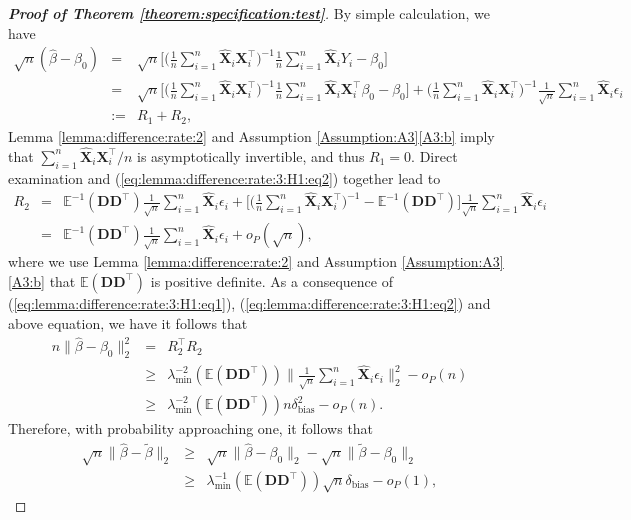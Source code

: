 \documentclass[11pt, preprint]{imsart}
\numberwithin{equation}{section}
\def \bfD{\mathbf{D}}
\def \bfX{\mathbf{X}}
\def \bfD{\mathbf{D}}
\def \ev{\mathbb{E}}
\theoremstyle{plain}
\theoremstyle{definition}
\begin{document}
\begin{proof}[\textbf{Proof of Theorem \ref{theorem:specification:test}}]
By simple calculation, we have
\begin{eqnarray*}
	\sqrt{n}(\widehat{\beta}-\beta_0)&=&\sqrt{n}\bigg[\bigg(\frac{1}{n}\sum_{i=1}^n\widehat{\bfX}_i{\bfX}_i^\top\bigg)^{-1}\frac{1}{n}\sum_{i=1}^n\widehat{\bfX}_iY_i-\beta_0\bigg]\nonumber\\
	&=&\sqrt{n}\bigg[\bigg(\frac{1}{n}\sum_{i=1}^n\widehat{\bfX}_i{\bfX}_i^\top\bigg)^{-1}\frac{1}{n}\sum_{i=1}^n\widehat{\bfX}_i\bfX_i^\top \beta_0-\beta_0\bigg]+\bigg(\frac{1}{n}\sum_{i=1}^n\widehat{\bfX}_i{\bfX}_i^\top\bigg)^{-1}\frac{1}{\sqrt{n}}\sum_{i=1}^n\widehat{\bfX}_i\epsilon_i\nonumber\\
	&:=&R_1+R_2,
\end{eqnarray*}
Lemma \ref{lemma:difference:rate:2} and Assumption \ref{Assumption:A3}\ref{A3:b} imply that $\sum_{i=1}^n\widehat{\bfX}_i{\bfX}_i^\top/n$ is asymptotically invertible, and thus $R_1=0$. 
Direct examination and (\ref{eq:lemma:difference:rate:3:H1:eq2}) together lead to
\begin{eqnarray*}
	R_2&=&\ev^{-1}(\bfD\bfD^\top)\frac{1}{\sqrt{n}}\sum_{i=1}^n\widehat{\bfX}_i\epsilon_i+\bigg[\bigg(\frac{1}{n}\sum_{i=1}^n\widehat{\bfX}_i{\bfX}_i^\top\bigg)^{-1}-\ev^{-1}(\bfD\bfD^\top)\bigg]\frac{1}{\sqrt{n}}\sum_{i=1}^n\widehat{\bfX}_i\epsilon_i\nonumber\\
	&=& \ev^{-1}(\bfD\bfD^\top)\frac{1}{\sqrt{n}}\sum_{i=1}^n\widehat{\bfX}_i\epsilon_i+o_P(\sqrt{n}),\nonumber
\end{eqnarray*}
where we use Lemma \ref{lemma:difference:rate:2}  and Assumption  \ref{Assumption:A3}\ref{A3:b} that $\ev(\bfD\bfD^\top)$ is positive definite. As a consequence of (\ref{eq:lemma:difference:rate:3:H1:eq1}),  (\ref{eq:lemma:difference:rate:3:H1:eq2}) and above equation, we have
it follows that
\begin{eqnarray*}
	n\|\widehat{\beta}-\beta_0\|_2^2&=& R_2^{\top}R_2\nonumber\\
	&\geq& \lambda_{\min}^{-2}(\ev(\bfD\bfD^\top))\bigg\|\frac{1}{\sqrt{n}}\sum_{i=1}^n\widehat{\bfX}_i\epsilon_i\bigg\|_2^2-o_P(n)\nonumber\\
	&\geq&  \lambda_{\min}^{-2}(\ev(\bfD\bfD^\top))n\delta_{\textrm{bias}}^2-o_P(n).
\end{eqnarray*}
Therefore, with probability approaching one, it follows that
\begin{eqnarray*}
	\sqrt{n}\|\widehat{\beta}-\widetilde{\beta}\|_2&\geq&	\sqrt{n}\|\widehat{\beta}-\beta_0\|_2-	\sqrt{n}\|\widetilde{\beta}-\beta_0\|_2\nonumber\\
	&\geq&  \lambda_{\min}^{-1}(\ev(\bfD\bfD^\top))\sqrt{n}\delta_{\textrm{bias}}-o_P(1),

\end{eqnarray*}
\end{proof}
\end{document}
